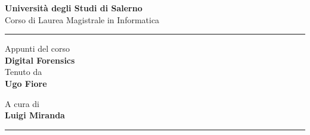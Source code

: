 \begin{titlepage} %
\begin{Large}
 \begin{center}
 \huge{ \bf Università degli Studi di Salerno\\ }
    \vspace{1mm}
	\large{{Corso di Laurea Magistrale in Informatica\\}}
    \vspace{2mm}
    \hrule %

    \vfill
    {{Appunti del corso}}\\
	\vspace{2mm}
	{\huge{\bf Digital Forensics}}\\
    \vspace{2mm}
     \small{Tenuto da \\ \bf Ugo Fiore}
 \vspace{2mm}
     \small{}
\end{center}
\end{Large}

\vfill
\begin{flushright}
   A cura di\\
    \bf Luigi Miranda
\end{flushright}

\hrule
\vspace{2mm}
\end{titlepage}
